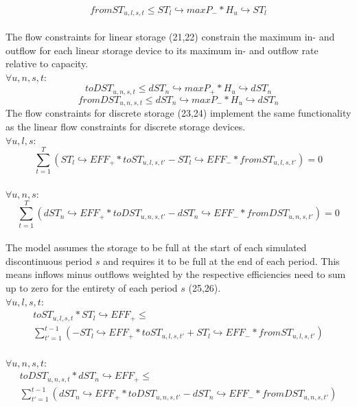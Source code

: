 \documentclass[
	11pt,								%
	DIV10,								%
	a4paper,         					%
	oneside,							%
	headheight=20pt,					%
	footheight=20pt,					%
    parskip=full,						%
    listof=totoc,						%
	bibliography=totoc,					%
	index=totoc,						%
]{scrartcl}
\begin{document}
	\begin{equation}
		fromST_{u,l,s,t} \leq ST_l\hookrightarrow  maxP_{-} * H_u \hookrightarrow ST_l
	\end{equation}
	\\
	The flow constraints for linear storage (21,22) constrain the maximum in- and outflow for each linear storage device to its maximum in- and outflow rate relative to capacity.
	\\
	$\forall u,n,s,t$:
	\begin{equation}
		toDST_{u,n,s,t} \leq dST_n\hookrightarrow  maxP_{+} * H_u \hookrightarrow dST_n
	\end{equation}
	\begin{equation}
		fromDST_{u,n,s,t} \leq dST_n\hookrightarrow  maxP_{-} * H_u \hookrightarrow dST_n
	\end{equation}
	The flow constraints for discrete storage (23,24) implement the same functionality as the linear flow constraints for discrete storage devices.
	\\
	$\forall u,l,s$:
	\begin{equation}
		\sum_{t=1}^{T}(ST_l \hookrightarrow EFF_{+} * toST_{u,l,s,t'} - ST_l \hookrightarrow EFF_{-} * fromST_{u,l,s,t'}) = 0
	\end{equation}
	\\
	$\forall u,n,s$:
	\begin{equation}
		\sum_{t=1}^{T}(dST_n \hookrightarrow EFF_{+} * toDST_{u,n,s,t'} - dST_n \hookrightarrow EFF_{-} * fromDST_{u,n,s,t'}) = 0
	\end{equation}
	\\
	The model assumes the storage to be full at the start of each simulated discontinuous period $s$ and requires it to be full at the end of each period. This means inflows minus outflows weighted by the respective efficiencies need to sum up to zero for the entirety of each period $s$ (25,26).
	\\
	$\forall u,l,s,t$:
	\begin{equation}
		\begin{split}
		toST_{u,l,s,t} * ST_l \hookrightarrow EFF_{+} \leq \\
		\sum_{t'=1}^{t-1}(-ST_l \hookrightarrow EFF_{+} * toST_{u,l,s,t'} + ST_l \hookrightarrow EFF_{-} * fromST_{u,l,s,t'})
		\end{split}
	\end{equation}
	\\
	$\forall u,n,s,t$:
	\begin{equation}
		\begin{split}
		toDST_{u,n,s,t} * dST_n \hookrightarrow EFF_{+} \leq \\
		\sum_{t'=1}^{t-1}(dST_n \hookrightarrow EFF_{+} * toDST_{u,n,s,t'} - dST_n \hookrightarrow EFF_{-} * fromDST_{u,n,s,t'})
		\end{split}
	\end{equation}
\end{document}
